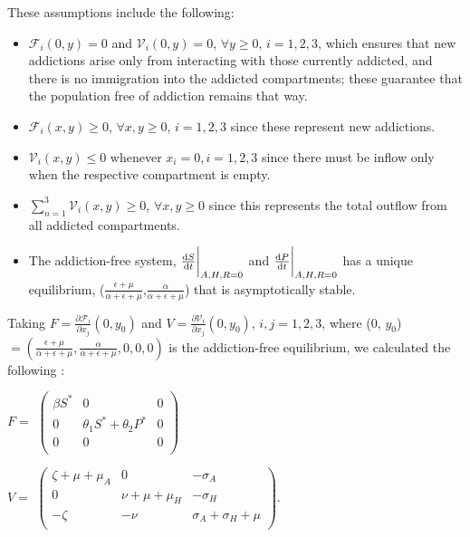 \documentclass[12pt]{article}
\begin{document}
These assumptions include the following: 
\begin{itemize}
\item $\mathscr{F}_{i} (0,y)=0$ and $\mathscr{V}_{i}(0,y)=0$,  $\forall$$y \geq 0$, $i=1,2,3$, which ensures that new addictions arise only from interacting with those currently addicted, and there is no immigration into the addicted compartments; these guarantee that the population free of addiction remains that way. 
\item $\mathscr{F}_{i} (x,y) \geq 0$, $\forall$$x,y \geq 0$, $i=1,2,3$ since these represent new addictions. 
\item $\mathscr{V}_{i}(x,y) \leq 0$ whenever $x_i=0, i=1,2,3$ since there must be inflow only when the respective compartment is empty. 
\item $\sum_{n=1}^{3} \mathscr{V}_{i}(x,y) \geq 0$, $\forall x,y \geq 0$ since this represents the total outflow from all addicted compartments. 
\item The addiction-free system, $\dv{S}{t}\bigg|_{A,H,R=0}$ and $\dv{P}{t}\bigg|_{A,H,R=0}$ has a unique equilibrium, ($\frac{\epsilon+\mu}{\alpha+\epsilon+\mu}$,$\frac{\alpha}{\alpha+\epsilon+\mu}$) that is asymptotically stable. 
\end{itemize}

Taking $F=\frac{\partial \mathscr{F}_i}{\partial x_j} (0, y_0)$ and $V=\frac{\partial \mathscr{V}_i}{\partial x_j} (0, y_0)$, $i, j =1, 2, 3$, where (0, $y_{0}$) $=(\frac{\epsilon + \mu}{\alpha + \epsilon +\mu},\frac{\alpha}{\alpha + \epsilon +\mu},0,0,0)$ is the addiction-free equilibrium, we calculated the following \cite{Driessche}: 



\begin{center}
$F=$
$ \begin{pmatrix}

\beta S^* &  0  & 0 \\
0 & \theta_1 S^* +\theta_2 P^* & 0\\
0  &   0 & 0\\
\end{pmatrix}$



$V=$
$ \begin{pmatrix}

\zeta +\mu +\mu_A &  0  & -\sigma_A \\
0 &  \nu+\mu+\mu_H & -\sigma_H\\
-\zeta& -\nu  & \sigma_A + \sigma_H + \mu\\

\end{pmatrix}$.
\end{center}
\end{document}
